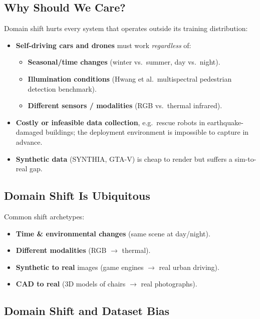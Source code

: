 \documentclass[11pt,a4paper]{article}
\theoremstyle{definition}
\theoremstyle{plain}
\theoremstyle{remark}
\begin{document}
\subsection{Why Should We Care?}

Domain shift hurts every system that operates outside its training distribution:

\begin{itemize}
    \item \textbf{Self-driving cars and drones} must work \emph{regardless} of:
    \begin{itemize}
        \item \textbf{Seasonal/time changes} (winter vs.\ summer, day vs.\ night).
        \item \textbf{Illumination conditions} (Hwang et al.\ multispectral pedestrian detection benchmark).
        \item \textbf{Different sensors / modalities} (RGB vs.\ thermal infrared).
    \end{itemize}
    \item \textbf{Costly or infeasible data collection}, e.g.\ rescue robots in earthquake-damaged buildings; the deployment environment is impossible to capture in advance.
    \item \textbf{Synthetic data} (SYNTHIA, GTA-V) is cheap to render but suffers a sim-to-real gap.
\end{itemize}

\subsection{Domain Shift Is Ubiquitous}

Common shift archetypes:
\begin{itemize}
    \item \textbf{Time \& environmental changes} (same scene at day/night).
    \item \textbf{Different modalities} (RGB $\to$ thermal).
    \item \textbf{Synthetic to real} images (game engines $\to$ real urban driving).
    \item \textbf{CAD to real} (3D models of chairs $\to$ real photographs).
\end{itemize}

\subsection{Domain Shift and Dataset Bias}
\end{document}
